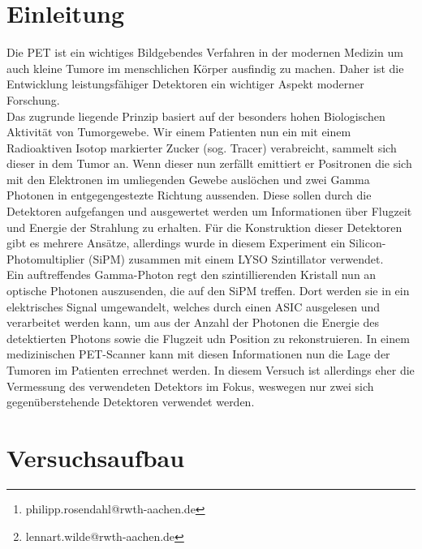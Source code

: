 \documentclass[12pt,twoside,a4paper]{scrartcl}
\author{Philipp Rosendahl Mat.-Nr: 378092\thanks{philipp.rosendahl@rwth-aachen.de}
		\and Lennart Wilde, Mat.-Nr: 381588\thanks{lennart.wilde@rwth-aachen.de}}
\begin{document}
\maketitle
\newpage

\tableofcontents
\newpage


\section{Einleitung}

	Die PET ist ein wichtiges Bildgebendes Verfahren in der modernen Medizin um auch kleine Tumore im menschlichen Körper ausfindig zu machen. Daher ist die Entwicklung leistungsfähiger Detektoren ein wichtiger Aspekt moderner Forschung. \\

	Das zugrunde liegende Prinzip basiert auf der besonders hohen Biologischen Aktivität von Tumorgewebe. Wir einem Patienten nun ein mit einem Radioaktiven Isotop markierter Zucker (sog. Tracer) verabreicht, sammelt sich dieser in dem Tumor an. Wenn dieser nun zerfällt emittiert er Positronen die sich mit den Elektronen im umliegenden Gewebe auslöchen und zwei Gamma Photonen in entgegengestezte Richtung aussenden. Diese sollen durch die Detektoren aufgefangen und ausgewertet werden um Informationen über Flugzeit und Energie der Strahlung zu erhalten. Für die Konstruktion dieser Detektoren gibt es mehrere Ansätze, allerdings wurde in diesem Experiment ein Silicon-Photomultiplier (SiPM) zusammen mit einem LYSO Szintillator verwendet.\\

	Ein auftreffendes Gamma-Photon regt den szintillierenden Kristall nun an optische Photonen auszusenden, die auf den SiPM treffen. Dort werden sie in ein elektrisches Signal umgewandelt, welches durch einen ASIC ausgelesen und verarbeitet werden kann, um aus der Anzahl der Photonen die Energie des detektierten Photons sowie die Flugzeit udn Position zu rekonstruieren. In einem medizinischen PET-Scanner kann mit diesen Informationen nun die Lage der Tumoren im Patienten errechnet werden. In diesem Versuch ist allerdings eher die Vermessung des verwendeten Detektors im Fokus, weswegen nur zwei sich gegenüberstehende Detektoren verwendet werden.

	\newpage

\section{Versuchsaufbau}
\end{document}
